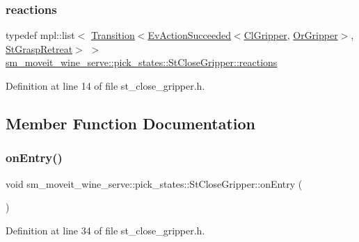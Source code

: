 \subsubsection{\texorpdfstring{reactions}{reactions}}
{\footnotesize\ttfamily typedef mpl\+::list$<$ \hyperlink{classsmacc_1_1Transition}{Transition}$<$\hyperlink{structsmacc_1_1default__events_1_1EvActionSucceeded}{Ev\+Action\+Succeeded}$<$\hyperlink{classsm__moveit__wine__serve_1_1cl__gripper_1_1ClGripper}{Cl\+Gripper}, \hyperlink{classsm__moveit__wine__serve_1_1OrGripper}{Or\+Gripper}$>$, \hyperlink{structsm__moveit__wine__serve_1_1pick__states_1_1StGraspRetreat}{St\+Grasp\+Retreat}$>$ $>$ \hyperlink{structsm__moveit__wine__serve_1_1pick__states_1_1StCloseGripper_a725db6c10ec5d4985bfa56cdc0040bb3}{sm\+\_\+moveit\+\_\+wine\+\_\+serve\+::pick\+\_\+states\+::\+St\+Close\+Gripper\+::reactions}}



Definition at line 14 of file st\+\_\+close\+\_\+gripper.\+h.



\subsection{Member Function Documentation}
\mbox{\label{structsm__moveit__wine__serve_1_1pick__states_1_1StCloseGripper_af88770eb5b05ceb69249c36bd9f91cb9}} 
\subsubsection{\texorpdfstring{on\+Entry()}{onEntry()}}
{\footnotesize\ttfamily void sm\+\_\+moveit\+\_\+wine\+\_\+serve\+::pick\+\_\+states\+::\+St\+Close\+Gripper\+::on\+Entry (\begin{DoxyParamCaption}{ }\end{DoxyParamCaption})\hspace{0.3cm}{\ttfamily [inline]}}



Definition at line 34 of file st\+\_\+close\+\_\+gripper.\+h.


